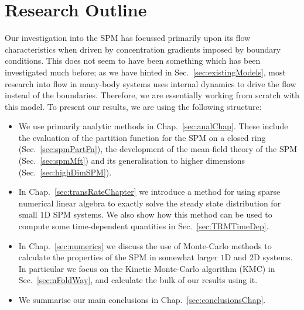 \section{Research Outline}
Our investigation into the SPM has focussed primarily upon its flow characteristics when driven
by concentration gradients imposed by boundary conditions. This does not seem to have been something
which has been investigated much before; as we have hinted in Sec.~\ref{sec:existingModels}, most
research into flow in many-body systems uses internal dynamics to drive the flow instead of the 
boundaries. Therefore, we are essentially working from scratch with this model.
To present our results, we are using the following structure:
\begin{itemize}
 \item We use primarily analytic methods in Chap.~\ref{sec:analChap}. These include the evaluation
 of the partition function for the SPM on a closed ring (Sec.~\ref{sec:spmPartFn}), the development
 of the mean-field theory of the SPM (Sec.~\ref{sec:spmMft}) and its generalisation to higher dimensions
 (Sec.~\ref{sec:highDimSPM}).
 \item In Chap.~\ref{sec:transRateChapter} we introduce a method for using sparse numerical linear
 algebra to exactly solve the steady state distribution for small $1$D SPM systems. We also show how this
 method can be used to compute some time-dependent quantities in Sec.~\ref{sec:TRMTimeDep}.
 \item In Chap.~\ref{sec:numerics} we discuss the use of Monte-Carlo methods to calculate the properties
 of the SPM in somewhat larger $1$D and $2$D systems. In particular we focus on the Kinetic
  Monte-Carlo algorithm (KMC) in Sec.~\ref{sec:nFoldWay}, and calculate the bulk of our results
  using it.
\item We summarise our main conclusions in Chap.~\ref{sec:conclusionsChap}.
\end{itemize}


